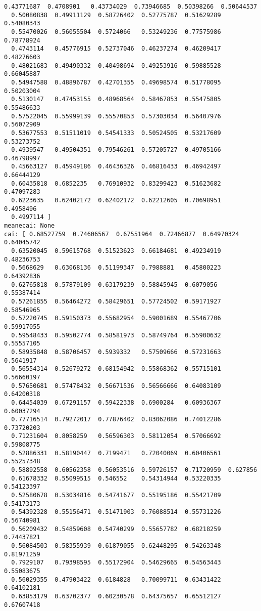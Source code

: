 \documentclass[11pt]{article}
\begin{document}
\begin{Verbatim}[commandchars=\\\{\}]
  0.43771687  0.4708901   0.43734029  0.73946685  0.50398266  0.50644537
  0.50080838  0.49911129  0.58726402  0.52775787  0.51629289  0.54080343
  0.55470026  0.56055504  0.5724066   0.53249236  0.77575986  0.78778924
  0.4743114   0.45776915  0.52737046  0.46237274  0.46209417  0.48276603
  0.48021683  0.49490332  0.40498694  0.49253916  0.59885528  0.66045887
  0.54947588  0.48896787  0.42701355  0.49698574  0.51778095  0.50203004
  0.5130147   0.47453155  0.48968564  0.58467853  0.55475805  0.55486633
  0.57522045  0.55999139  0.55570853  0.57303034  0.56407976  0.56072909
  0.53677553  0.51511019  0.54541333  0.50524505  0.53217609  0.53273752
  0.4939547   0.49504351  0.79546261  0.57205727  0.49705166  0.46798997
  0.45663127  0.45949186  0.46436326  0.46816433  0.46942497  0.66444129
  0.60435818  0.6852235   0.76910932  0.83299423  0.51623682  0.47097283
  0.6223635   0.62402172  0.62402172  0.62212605  0.70698951  0.4958496
  0.4997114 ]
meanecai: None
cai: [ 0.68527759  0.74606567  0.67551964  0.72466877  0.64970324  0.64045742
  0.63520045  0.59615768  0.51523623  0.66184681  0.49234919  0.48236753
  0.5668629   0.63068136  0.51199347  0.7988881   0.45800223  0.64392836
  0.62765818  0.57879109  0.63179239  0.58845945  0.6079056   0.55387414
  0.57261855  0.56464272  0.58429651  0.57724502  0.59171927  0.58546965
  0.57220745  0.59150373  0.55682954  0.59001689  0.55467706  0.59917055
  0.59548433  0.59502774  0.58581973  0.58749764  0.55900632  0.55557105
  0.58935848  0.58706457  0.5939332   0.57509666  0.57231663  0.5641917
  0.56554314  0.52679272  0.68154942  0.55868362  0.55715101  0.56660197
  0.57650681  0.57478432  0.56671536  0.56566666  0.64083109  0.64200318
  0.64454039  0.67291157  0.59422338  0.6900284   0.60936367  0.60037294
  0.77716514  0.79272017  0.77876402  0.83062086  0.74012286  0.73720203
  0.71231604  0.8058259   0.56596303  0.58112054  0.57066692  0.59808775
  0.52886331  0.58190447  0.7199471   0.72040069  0.60406561  0.55257348
  0.58892558  0.60562358  0.56053516  0.59726157  0.71720959  0.627856
  0.61678332  0.55099515  0.546552    0.54314944  0.53220335  0.54123397
  0.52580678  0.53034816  0.54741677  0.55195186  0.55421709  0.54173173
  0.54392328  0.55156471  0.51471903  0.76088514  0.55731226  0.56740981
  0.56209432  0.54859608  0.54740299  0.55657782  0.68218259  0.74437821
  0.56084503  0.58355939  0.61879055  0.62448295  0.54263348  0.81971259
  0.7929107   0.79398595  0.55172904  0.54629665  0.54563443  0.55083675
  0.56029355  0.47903422  0.6184828   0.70099711  0.63431422  0.64102181
  0.63853179  0.63702377  0.60230578  0.64375657  0.65512127  0.67607418

\end{Verbatim}
\end{document}
